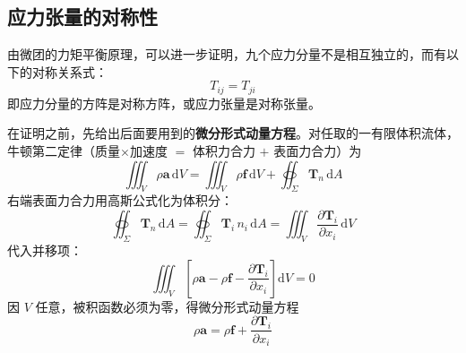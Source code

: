 \subsection{应力张量的对称性}

\begin{theorem}[应力张量的对称性]
	由微团的力矩平衡原理，可以进一步证明，九个应力分量不是相互独立的，而有以下的对称关系式：
	\begin{equation}\label{eq:stress-symmetry}
		T_{ij}=T_{ji}
	\end{equation}
	即应力分量的方阵是对称方阵，或应力张量是对称张量。
\end{theorem}

在证明之前，先给出后面要用到的\textbf{微分形式动量方程}。对任取的一有限体积流体，牛顿第二定律（质量$\times$加速度 $=$ 体积力合力 $+$ 表面力合力）为
\begin{equation}\label{eq:momentum-integral}
	\iiint_V\rho\boldsymbol{a}\,\mathrm{d}V=\iiint_V\rho\boldsymbol{f}\,\mathrm{d}V+\oiint_\Sigma\boldsymbol{T}_n\,\mathrm{d}A
\end{equation}
右端表面力合力用高斯公式化为体积分：
\begin{equation}\label{eq:surface-to-volume}
	\oiint_\Sigma\boldsymbol{T}_n\,\mathrm{d}A=\oiint_\Sigma\boldsymbol{T}_i\,n_i\,\mathrm{d}A=\iiint_V\frac{\partial\boldsymbol{T}_i}{\partial x_i}\,\mathrm{d}V
\end{equation}
代入并移项：
\begin{equation}
	\iiint_V\left[\rho\boldsymbol{a}-\rho\boldsymbol{f}-\frac{\partial\boldsymbol{T}_i}{\partial x_i}\right]\mathrm{d}V=0
\end{equation}
因 $V$ 任意，被积函数必须为零，得微分形式动量方程
\begin{equation}\label{eq:momentum-equation}
	\rho\boldsymbol{a}=\rho\boldsymbol{f}+\frac{\partial\boldsymbol{T}_i}{\partial x_i}
\end{equation}

